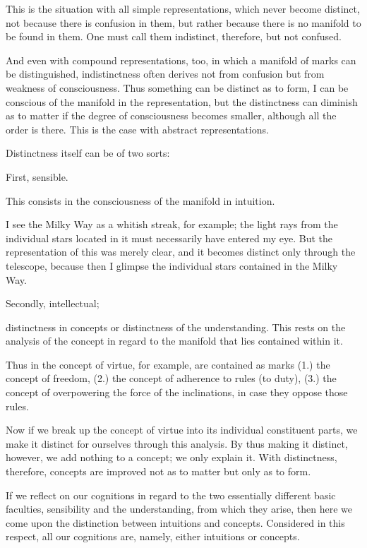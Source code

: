         This is the situation with all simple representations,
        which never become distinct,
        not because there is confusion in them,
        but rather because there is no manifold to be found in them.
        One must call them indistinct, therefore, but not confused.

        And even with compound representations, too, in which
        a manifold of marks can be distinguished,
        indistinctness often derives not from confusion
        but from weakness of consciousness.
        Thus something can be distinct as to form,
        I can be conscious of the manifold in the representation,
        but the distinctness can diminish as to matter
        if the degree of consciousness becomes smaller,
        although all the order is there.
        This is the case with abstract representations.

    Distinctness itself can be of two sorts:

    First, sensible.

    This consists in the consciousness of the manifold in intuition.

        I see the Milky Way as a whitish streak, for example;
        the light rays from the individual stars located in it
        must necessarily have entered my eye.
        But the representation of this was merely clear,
        and it becomes distinct only through the telescope,
        because then I glimpse the individual stars
        contained in the Milky Way.

    Secondly, intellectual;

    distinctness in concepts or distinctness of the understanding.
    This rests on the analysis of the concept in regard to
    the manifold that lies contained within it.

    Thus in the concept of virtue, for example,
    are contained as marks
    (1.) the concept of freedom,
    (2.) the concept of adherence to rules (to duty),
    (3.) the concept of overpowering the force of the inclinations,
    in case they oppose those rules.

        Now if we break up the concept of virtue
        into its individual constituent parts,
        we make it distinct for ourselves through this analysis.
        By thus making it distinct, however, we add nothing to a concept;
        we only explain it.
        With distinctness, therefore, concepts are improved
        not as to matter but only as to form.

    If we reflect on our cognitions in regard to
    the two essentially different basic faculties,
    sensibility and the understanding, from which they arise,
    then here we come upon the distinction
    between intuitions and concepts.
    Considered in this respect,
    all our cognitions are, namely,
    either intuitions or concepts.

